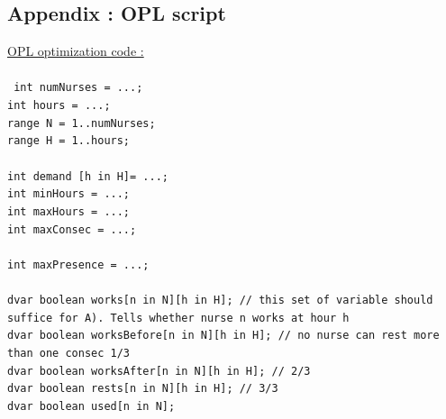 \documentclass[11pt]{article}
\begin{document}
\pagebreak
\begin{appendix}

\section{Appendix  : OPL script }
\label{appenOPL}
\underline{OPL optimization code :}\\\\
{\tt
int numNurses = ...;\\
int hours = ...;\\
range N = 1..numNurses;\\
range H = 1..hours;\\
\\
int demand [h in H]= ...;\\
int minHours = ...;\\
int maxHours = ...;\\
int maxConsec = ...;\\
\\
int maxPresence = ...;\\
\\
dvar boolean works[n in N][h in H]; // this set of variable should suffice for A). Tells whether nurse n works at hour h\\
dvar boolean worksBefore[n in N][h in H]; // no nurse can rest more than one consec 1/3\\
dvar boolean worksAfter[n in N][h in H]; // 2/3\\
dvar boolean rests[n in N][h in H]; // 3/3\\
dvar boolean used[n in N];\\
\\\\

}
\end{appendix}
\end{document}
